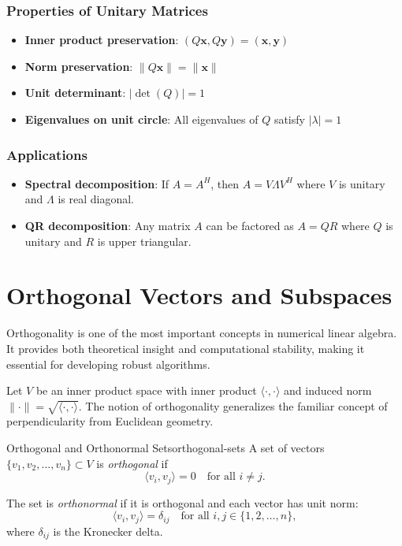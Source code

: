 \subsubsection{Properties of Unitary Matrices}

\begin{itemize}
    \item \textbf{Inner product preservation}: $(Q\mathbf{x}, Q\mathbf{y}) = (\mathbf{x}, \mathbf{y})$
    \item \textbf{Norm preservation}: $\|Q\mathbf{x}\| = \|\mathbf{x}\|$
    \item \textbf{Unit determinant}: $|\det(Q)| = 1$
    \item \textbf{Eigenvalues on unit circle}: All eigenvalues of $Q$ satisfy $|\lambda| = 1$
\end{itemize}

\subsubsection{Applications}
\begin{itemize}
    \item \textbf{Spectral decomposition}: If $A = A^H$, then $A = V\Lambda V^H$ where $V$ is unitary and $\Lambda$ is real diagonal.
    \item \textbf{QR decomposition}: Any matrix $A$ can be factored as $A = QR$ where $Q$ is unitary and $R$ is upper triangular.
\end{itemize}

\section{Orthogonal Vectors and Subspaces}
\label{sec:orthogonal-subspaces}

Orthogonality is one of the most important concepts in numerical linear algebra. It provides both theoretical insight and computational stability, making it essential for developing robust algorithms.

Let $V$ be an inner product space with inner product $\langle \cdot, \cdot \rangle$ and induced norm $\|\cdot\| = \sqrt{\langle \cdot, \cdot \rangle}$. The notion of orthogonality generalizes the familiar concept of perpendicularity from Euclidean geometry.

\begin{definition}{Orthogonal and Orthonormal Sets}{orthogonal-sets}
    A set of vectors $\{v_1, v_2, \ldots, v_n\} \subset V$ is \emph{orthogonal} if
    \[
        \langle v_i, v_j \rangle = 0 \quad \text{for all } i \neq j.
    \]

    The set is \emph{orthonormal} if it is orthogonal and each vector has unit norm:
    \[
        \langle v_i, v_j \rangle = \delta_{ij} \quad \text{for all } i, j \in \{1, 2, \ldots, n\},
    \]
    where $\delta_{ij}$ is the Kronecker delta.
\end{definition}


